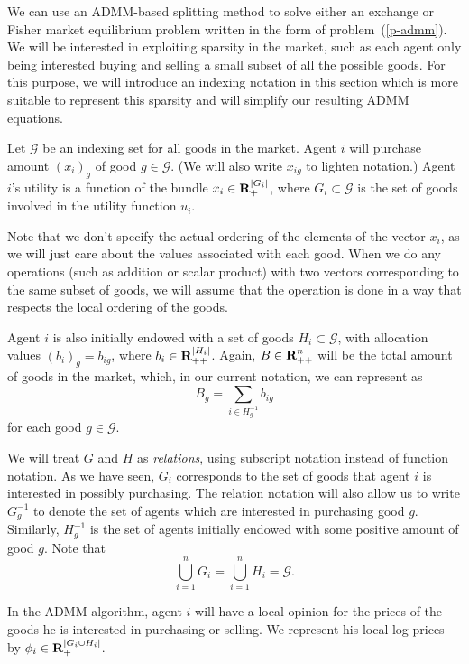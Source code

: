 \documentclass[12pt]{article}
\begin{document}
We can use an ADMM-based splitting method \cite{boyd2011distributed} to solve
either an exchange or Fisher market equilibrium problem written in the form of
problem~(\ref{p-admm}). We will be interested in exploiting sparsity in the
market, such as each agent only being interested buying and selling a small
subset  of all the possible goods. For this purpose, we will introduce an
indexing notation in this section which is more suitable to represent this
sparsity and will simplify our resulting ADMM equations.

Let $\mathcal{G}$ be an indexing set for all goods
in the market.
Agent $i$ will purchase amount $(x_i)_g$ of good $g \in \mathcal{G}$.
(We will also write $x_{ig}$ to lighten notation.)
Agent $i$'s utility is a function of the bundle $x_i \in {\mbox{\bf R}}_{+}^{|G_i|}$,
where $G_i \subset \mathcal{G}$ is the set of goods involved in the utility
function $u_i$.

Note that we don't specify the actual ordering of the elements
of the vector $x_i$, as we will just care about the values associated with
each good.
When we do any operations (such as addition or scalar product) with
two vectors corresponding to the same subset of goods, we will
assume that the operation is done in a way that respects the local ordering of
the goods.

Agent $i$ is also initially endowed with a set of goods
$H_i \subset \mathcal{G}$,
with allocation values $(b_i)_g = b_{ig}$, where $b_i \in {\mbox{\bf R}}_{++}^{|H_i|}$.
Again, $B \in {\mbox{\bf R}}^n_{++}$ will be the total amount of goods in the market,
which, in our current notation, we can represent as
\[
B_g = \sum\limits_{i \in H^{-1}_g} b_{ig}
\]
for each good $g \in \mathcal{G}$.

We will treat $G$ and $H$ as \emph{relations}, using subscript notation instead
of function notation. As we have seen, $G_i$ corresponds to the set of goods
that agent $i$ is interested in possibly purchasing. The relation notation will
also allow us to write $G^{-1}_g$ to denote the set of agents which are
interested in purchasing good $g$. Similarly, $H^{-1}_g$ is the set of agents
initially endowed with some positive amount of good $g$. Note that
\[
\bigcup_{i=1}^n G_i = \bigcup_{i=1}^n H_i = \mathcal{G}.
\]

In the ADMM algorithm, agent $i$ will have a local opinion for the prices
of the goods he is interested in purchasing or selling.
We represent his local log-prices
by $\phi_i \in {\mbox{\bf R}}_+^{|G_i \cup H_i|}$.
\end{document}
